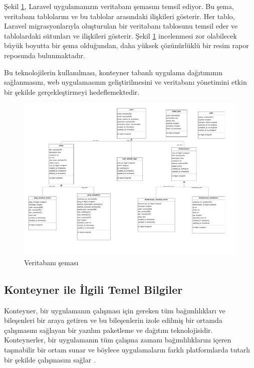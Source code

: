 Şekil \ref{fig:veritabani_diyagrami}, Laravel uygulamanızın veritabanı şemasını temsil ediyor. Bu şema, veritabanı tablolarını ve bu tablolar arasındaki ilişkileri gösterir. Her tablo, Laravel migrasyonlarıyla oluşturulan bir veritabanı tablosunu temsil eder ve tablolardaki sütunları ve ilişkileri gösterir. Şekil \ref{fig:veritabani_diyagrami} incelenmesi zor olabilecek büyük boyutta bir şema olduğundan, daha yüksek çözünürlüklü bir resim rapor reposunda bulunmaktadır.

Bu teknolojilerin kullanılması, konteyner tabanlı uygulama dağıtımının sağlanmasını, web uygulamasının geliştirilmesini ve veritabanı yönetimini etkin bir şekilde gerçekleştirmeyi hedeflemektedir.
\begin{figure}[ht]
  \includegraphics[width=\linewidth]{images/exported_from_idea.drawio.pdf}
  \caption{Veritabanı şeması}
  \label{fig:veritabani_diyagrami}
  \end{figure}
\subsection{Konteyner ile İlgili Temel Bilgiler}
Konteyner, bir uygulamanın çalışması için gereken tüm bağımlılıkları ve bileşenleri bir araya getiren ve bu bileşenlerin izole edilmiş bir ortamda çalışmasını sağlayan bir yazılım paketleme ve dağıtım teknolojisidir. Konteynerler, bir uygulamanın tüm çalışma zamanı bağımlılıklarını içeren taşınabilir bir ortam sunar ve böylece uygulamaların farklı platformlarda tutarlı bir şekilde çalışmasını sağlar \cite{domenici_bravo}.

